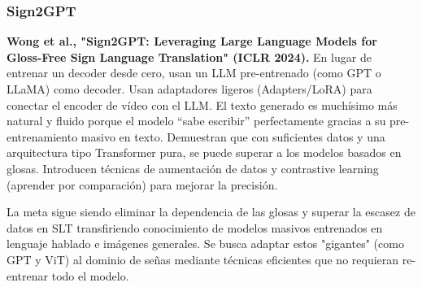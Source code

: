 \documentclass[11pt,a4paper]{article}
\begin{document}
\subsubsection*{Sign2GPT}
\textbf{Wong et al., "Sign2GPT: Leveraging Large Language Models for Gloss-Free Sign Language Translation" (ICLR 2024).} En lugar de entrenar un decoder desde cero, usan un LLM pre-entrenado (como GPT o LLaMA) como decoder. Usan adaptadores ligeros (Adapters/LoRA) para conectar el encoder de vídeo con el LLM. El texto generado es muchísimo más natural y fluido porque el modelo ``sabe escribir'' perfectamente gracias a su pre-entrenamiento masivo en texto. Demuestran que con suficientes datos y una arquitectura tipo Transformer pura, se puede superar a los modelos basados en glosas. Introducen técnicas de aumentación de datos y contrastive learning (aprender por comparación) para mejorar la precisión.

La meta sigue siendo eliminar la dependencia de las glosas y superar la escasez de datos en SLT transfiriendo conocimiento de modelos masivos entrenados en lenguaje hablado e imágenes generales. Se busca adaptar estos "gigantes" (como GPT y ViT) al dominio de señas mediante técnicas eficientes que no requieran re-entrenar todo el modelo.
\end{document}
